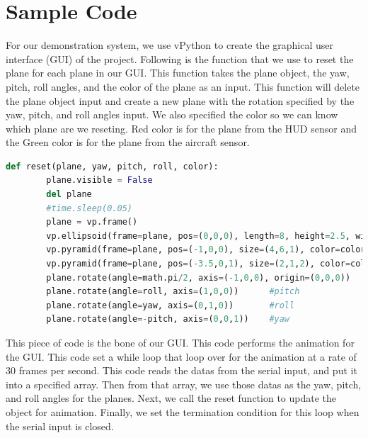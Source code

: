 \section{Sample Code}
For our demonstration system, we use vPython to create the graphical user interface (GUI) of the project. Following is the function that we use to reset the plane for each plane in our GUI. This function takes the plane object, the yaw, pitch, roll angles, and the color of the plane as an input. This function will delete the plane object input and create a new plane with the rotation specified by the yaw, pitch, and roll angles input. We also specified the color so we can know which plane are we reseting. Red color is for the plane from the HUD sensor and the Green color is for the plane from the aircraft sensor.\\

\begin{lstlisting}[language=python]
	def reset(plane, yaw, pitch, roll, color):
		plane.visible = False
		del plane
		#time.sleep(0.05)
		plane = vp.frame()
		vp.ellipsoid(frame=plane, pos=(0,0,0), length=8, height=2.5, width=2.5, color=color, opacity=0.5)
		vp.pyramid(frame=plane, pos=(-1,0,0), size=(4,6,1), color=color, opacity=0.5)
		vp.pyramid(frame=plane, pos=(-3.5,0,1), size=(2,1,2), color=color, opacity=0.5)
		plane.rotate(angle=math.pi/2, axis=(-1,0,0), origin=(0,0,0))
		plane.rotate(angle=roll, axis=(1,0,0))		#pitch
		plane.rotate(angle=yaw, axis=(0,1,0))		#roll
		plane.rotate(angle=-pitch, axis=(0,0,1))	#yaw
\end{lstlisting}

This piece of code is the bone of our GUI. This code performs the animation for the GUI. This code set a while loop that loop over for the animation at a rate of 30 frames per second. This code reads the datas from the serial input, and put it into a specified array. Then from that array, we use those datas as the yaw, pitch, and roll angles for the planes. Next, we call the reset function to update the object for animation. Finally, we set the termination condition for this loop when the serial input is closed.\\

